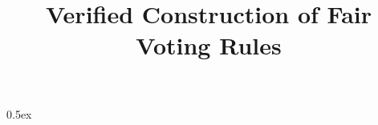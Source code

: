 \documentclass[11pt,a4paper,notitlepage]{report}
\begin{document}
\title{Verified Construction of Fair Voting Rules}
\author{}
\maketitle

{%
\sectionfont{\Huge}%
\let\clearpage\relax\tableofcontents%
\sectionfont{\Large}%
}

\parindent 0pt\parskip 0.5ex



%
%
\end{document}
